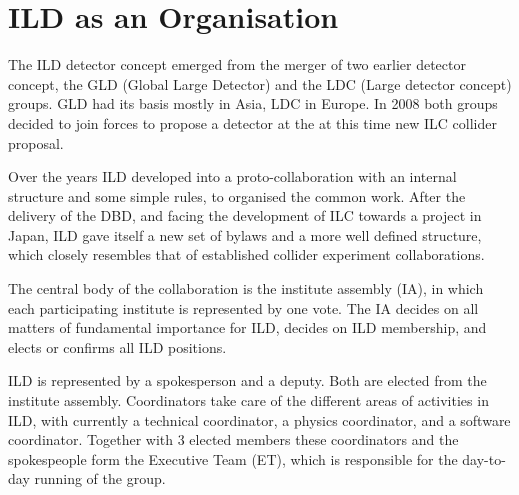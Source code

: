 \chapter{ILD as an Organisation}
The ILD detector concept emerged from the merger of two earlier detector concept, the GLD (Global Large Detector) and the LDC (Large detector concept) groups. GLD had its basis mostly in Asia, LDC in Europe. In 2008 both groups decided to join forces to propose a detector at the at this time new ILC collider proposal. 

Over the years ILD developed into a proto-collaboration with an internal structure and some simple rules, to organised the common work. After the delivery of the DBD, and facing the development of ILC towards a project in Japan, ILD gave itself a new set of bylaws and a more well defined structure, which closely resembles that of established collider experiment collaborations. 

The central body of the collaboration is the institute assembly (IA), in which each participating institute is represented by one vote. The IA decides on all matters of fundamental importance for ILD, decides on ILD membership, and elects or confirms all ILD positions. 

ILD is represented by a spokesperson and a deputy. Both are elected from the institute assembly. Coordinators take care of the different areas of activities in ILD, with currently a technical coordinator, a physics coordinator, and a software coordinator. Together with 3 elected members these coordinators and the spokespeople form the Executive Team (ET), which is responsible for the day-to-day running of the group. 

